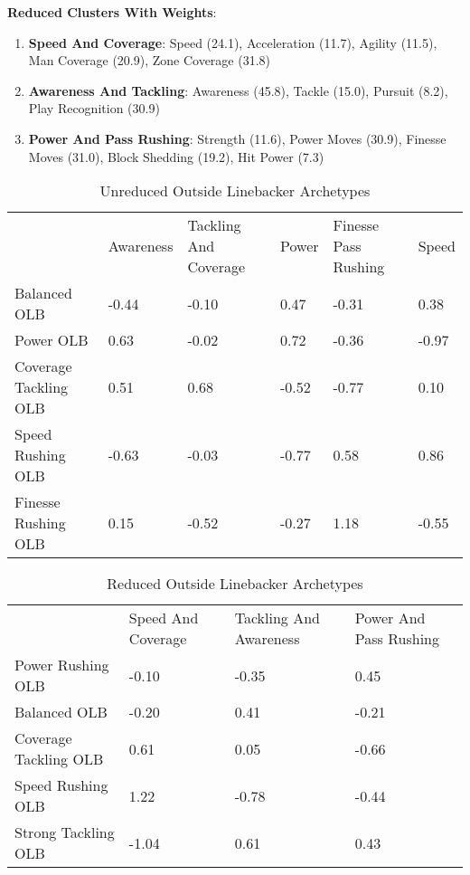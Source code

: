 \documentclass[11pt]{article}
\begin{document}
\textbf{Reduced Clusters With Weights}:

\begin{enumerate}
\item{\textbf{Speed And Coverage}}: Speed (24.1), Acceleration (11.7), Agility (11.5), Man Coverage (20.9), Zone Coverage (31.8)
\item{\textbf{Awareness And Tackling}}: Awareness (45.8), Tackle (15.0), Pursuit (8.2), Play Recognition (30.9)
\item{\textbf{Power And Pass Rushing}}: Strength (11.6), Power Moves (30.9), Finesse Moves (31.0), Block Shedding (19.2), Hit Power (7.3)
\end{enumerate}

\begin{table}[]
\centering
\caption{Unreduced Outside Linebacker Archetypes}
\label{UnreducedOutsideLinebacker}
\begin{tabular}{llllll}
                      & Awareness & Tackling And Coverage & Power & Finesse Pass Rushing & Speed \\
Balanced OLB          & -0.44     & -0.10                 & 0.47  & -0.31                & 0.38  \\
Power OLB             & 0.63      & -0.02                 & 0.72  & -0.36                & -0.97 \\
Coverage Tackling OLB & 0.51      & 0.68                  & -0.52 & -0.77                & 0.10  \\
Speed Rushing OLB     & -0.63     & -0.03                 & -0.77 & 0.58                 & 0.86  \\
Finesse Rushing OLB   & 0.15      & -0.52                 & -0.27 & 1.18                 & -0.55
\end{tabular}
\end{table}

\begin{table}[]
\centering
\caption{Reduced Outside Linebacker Archetypes}
\label{ReducedOutsideLinebacker}
\begin{tabular}{llll}
                      & Speed And Coverage & Tackling And Awareness & Power And Pass Rushing \\
Power Rushing OLB     & -0.10              & -0.35                  & 0.45                   \\
Balanced OLB          & -0.20              & 0.41                   & -0.21                  \\
Coverage Tackling OLB & 0.61               & 0.05                   & -0.66                  \\
Speed Rushing OLB     & 1.22               & -0.78                  & -0.44                  \\
Strong Tackling OLB   & -1.04              & 0.61                   & 0.43                  
\end{tabular}
\end{table}
\end{document}
